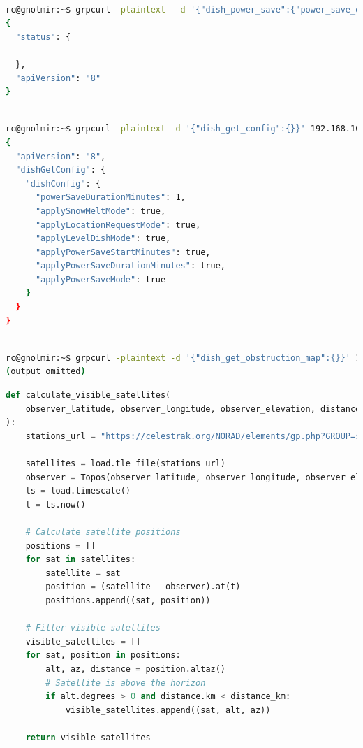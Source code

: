 \documentclass[IN,11pt,twoside,openright,idp,english]{tumthesis}
\begin{document}
\begin{lstlisting}[language=bash,basicstyle=\tiny]

rc@gnolmir:~$ grpcurl -plaintext  -d '{"dish_power_save":{"power_save_duration_minutes":1}}' 192.168.100.1:9200 SpaceX.API.Device.Device/Handle
{
  "status": {
    
  },
  "apiVersion": "8"
}
\end{lstlisting}
\begin{lstlisting}[language=bash,basicstyle=\tiny]

rc@gnolmir:~$ grpcurl -plaintext -d '{"dish_get_config":{}}' 192.168.100.1:9200 SpaceX.API.Device.Device/Handle
{
  "apiVersion": "8",
  "dishGetConfig": {
    "dishConfig": {
      "powerSaveDurationMinutes": 1,
      "applySnowMeltMode": true,
      "applyLocationRequestMode": true,
      "applyLevelDishMode": true,
      "applyPowerSaveStartMinutes": true,
      "applyPowerSaveDurationMinutes": true,
      "applyPowerSaveMode": true
    }
  }
}
\end{lstlisting}
\begin{lstlisting}[language=bash,basicstyle=\tiny]

rc@gnolmir:~$ grpcurl -plaintext -d '{"dish_get_obstruction_map":{}}' 192.168.100.1:9200 SpaceX.API.Device.Device/Handle
(output omitted)
\end{lstlisting}

\begin{lstlisting}[language=python,caption={the \texttt{calculate\_visible\_satellites} function},captionpos=b]
def calculate_visible_satellites(
    observer_latitude, observer_longitude, observer_elevation, distance_km
):
    stations_url = "https://celestrak.org/NORAD/elements/gp.php?GROUP=starlink&FORMAT=tle"

    satellites = load.tle_file(stations_url)
    observer = Topos(observer_latitude, observer_longitude, observer_elevation)
    ts = load.timescale()
    t = ts.now()

    # Calculate satellite positions
    positions = []
    for sat in satellites:
        satellite = sat
        position = (satellite - observer).at(t)
        positions.append((sat, position))

    # Filter visible satellites
    visible_satellites = []
    for sat, position in positions:
        alt, az, distance = position.altaz()
        # Satellite is above the horizon
        if alt.degrees > 0 and distance.km < distance_km:
            visible_satellites.append((sat, alt, az))

    return visible_satellites
\end{lstlisting}
\end{document}
